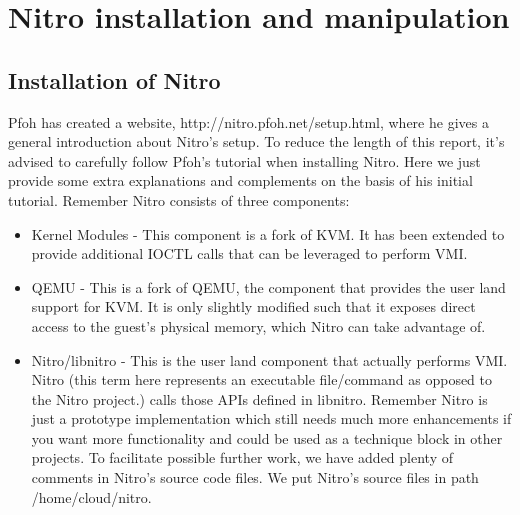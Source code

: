 
\chapter{Nitro installation and manipulation} %

\label{Chapter6} %



\section{Installation of Nitro}

Pfoh has created a website, http://nitro.pfoh.net/setup.html, where he gives a general introduction about Nitro’s setup. To reduce the length of this report, it’s advised to carefully follow Pfoh’s tutorial when installing Nitro. Here we just provide some extra explanations and complements on the basis of his initial tutorial. Remember Nitro consists of three components:
\begin{itemize}
    \item Kernel Modules - This component is a fork of KVM. It has been extended to provide additional IOCTL calls that can be leveraged to perform VMI.
    \item QEMU - This is a fork of QEMU, the component that provides the user land support for KVM. It is only slightly modified such that it exposes direct access to the guest's physical memory, which Nitro can take advantage of.
    \item Nitro/libnitro - This is the user land component that actually performs VMI. Nitro (this term here represents an executable file/command as opposed to the Nitro project.) calls those APIs defined in libnitro. Remember Nitro is just a prototype implementation which still needs much more enhancements if you want more functionality and could be used as a technique block in other projects. To facilitate possible further work, we have added plenty of comments in Nitro’s source code files. We put Nitro’s source files in path /home/cloud/nitro.
\end{itemize}

